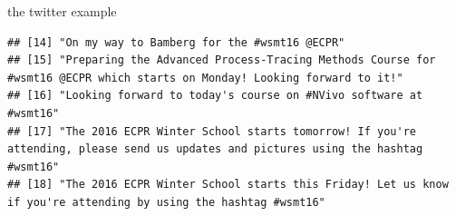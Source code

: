 \documentclass[ignorenonframetext,]{beamer}
\begin{document}
\begin{frame}[fragile]{the twitter example}
\begin{verbatim}
## [14] "On my way to Bamberg for the #wsmt16 @ECPR"                                                                                                    
## [15] "Preparing the Advanced Process-Tracing Methods Course for #wsmt16 @ECPR which starts on Monday! Looking forward to it!"                        
## [16] "Looking forward to today's course on #NVivo software at #wsmt16"                                                                               
## [17] "The 2016 ECPR Winter School starts tomorrow! If you're attending, please send us updates and pictures using the hashtag #wsmt16"               
## [18] "The 2016 ECPR Winter School starts this Friday! Let us know if you're attending by using the hashtag #wsmt16"
\end{verbatim}

\end{frame}
\end{document}
